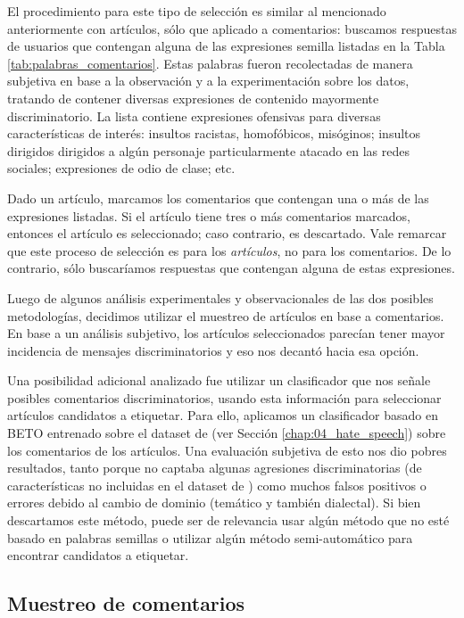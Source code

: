 El procedimiento para este tipo de selección es similar al mencionado anteriormente con artículos, sólo que aplicado a comentarios: buscamos respuestas de usuarios que contengan alguna de las expresiones semilla listadas en la Tabla \ref{tab:palabras_comentarios}. Estas palabras fueron recolectadas de manera subjetiva en base a la observación y a la experimentación sobre los datos, tratando de contener diversas expresiones de contenido mayormente discriminatorio. La lista contiene expresiones ofensivas para diversas características de interés: insultos racistas, homofóbicos, misóginos; insultos dirigidos dirigidos a algún personaje particularmente atacado en las redes sociales; expresiones de odio de clase; etc.

Dado un artículo, marcamos los comentarios que contengan una o más de las expresiones listadas. Si el artículo tiene tres o más comentarios marcados, entonces el artículo es seleccionado; caso contrario, es descartado. Vale remarcar que este proceso de selección es para los \emph{artículos}, no para los comentarios. De lo contrario, sólo buscaríamos respuestas que contengan alguna de estas expresiones.

Luego de algunos análisis experimentales y observacionales de las dos posibles metodologías, decidimos utilizar el muestreo de artículos en base a comentarios. En base a un análisis subjetivo, los artículos seleccionados parecían tener mayor incidencia de mensajes discriminatorios y eso nos decantó hacia esa opción.

Una posibilidad adicional analizado fue utilizar un clasificador que nos señale posibles comentarios discriminatorios, usando esta información para seleccionar artículos candidatos a etiquetar. Para ello, aplicamos un clasificador basado en BETO \cite{canete2020spanish} entrenado sobre el dataset de \hateval{} (ver Sección \ref{chap:04_hate_speech}) sobre los comentarios de los artículos. Una evaluación subjetiva de esto nos dio pobres resultados, tanto porque no captaba algunas agresiones discriminatorias (de características no incluidas en el dataset de \citet{hateval2019semeval}) como muchos falsos positivos o errores debido al cambio de dominio (temático y también dialectal). Si bien descartamos este método, puede ser de relevancia usar algún método que no esté basado en palabras semillas o utilizar algún método semi-automático para encontrar candidatos a etiquetar.


\subsection{Muestreo de comentarios}

